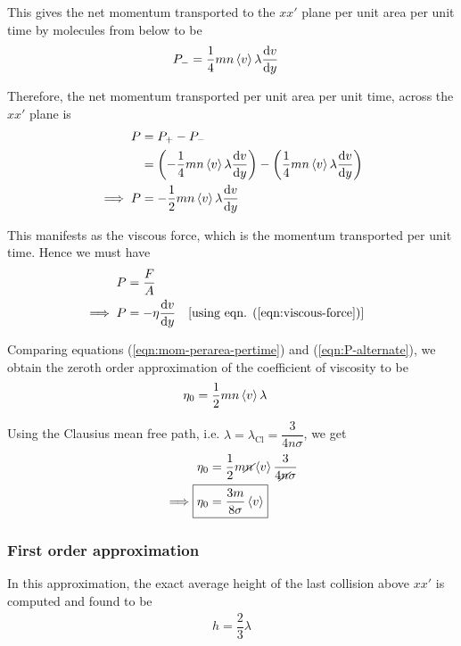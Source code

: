 			This gives the net momentum transported to the $xx'$ plane per unit area per unit time by molecules from below to be
			\begin{align*}
				P_-&=\dfrac{1}{4}mn\expval{v}\lambda\dv{v}{y}
			\end{align*}
			
			Therefore, the net momentum transported per unit area per unit time, across the $xx'$ plane is
			\begin{align}
				P&=P_+-P_- \nonumber\\
					&=\qty(-\dfrac{1}{4}mn\expval{v}\lambda\dv{v}{y})-\qty(\dfrac{1}{4}mn\expval{v}\lambda\dv{v}{y}) \nonumber\\
				\implies P&=-\dfrac{1}{2}mn\expval{v}\lambda\dv{v}{y} \label{eqn:mom-perarea-pertime}
			\end{align}
			
			This manifests as the viscous force, which is the momentum transported per unit time. Hence we must have
			\begin{align}
				P&=\dfrac{F}{A} \nonumber\\
				\implies P&=-\eta\dv{v}{y}\qq{[using eqn. (\ref{eqn:viscous-force})]} \label{eqn:P-alternate}
			\end{align}
			
			Comparing equations (\ref{eqn:mom-perarea-pertime}) and (\ref{eqn:P-alternate}), we obtain the zeroth order approximation of the coefficient of viscosity to be
			\begin{align*}
				\eta_0&=\dfrac{1}{2}mn\expval{v}\lambda
			\end{align*}
			
			Using the Clausius mean free path, i.e. $\lambda=\lambda_\text{Cl}=\dfrac{3}{4n\sigma}$, we get
			\begin{align*}
				\eta_0&=\dfrac{1}{2}m\cancel{n}\expval{v}\dfrac{3}{4\cancel{n}\sigma} \\
				\implies\Aboxed{\eta_0&=\dfrac{3m}{8\sigma}\expval{v}}
			\end{align*}
			
		\subsubsection{First order approximation}
			In this approximation, the exact average height of the last collision above $xx'$ is computed and found to be
			\begin{align*}
				h=\dfrac{2}{3}\lambda
			\end{align*}
			
